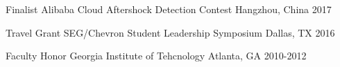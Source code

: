 \begin{cvhonors}

  \cvhonor
    {Finalist} %
    {Alibaba Cloud Aftershock Detection Contest} %
    {Hangzhou, China} %
    {2017} %

  \cvhonor
    {Travel Grant} %
    {SEG/Chevron Student Leadership Symposium} %
    {Dallas, TX} %
    {2016} %

  \cvhonor
    {Faculty Honor} %
    {Georgia Institute of Tehcnology} %
    {Atlanta, GA} %
    {2010-2012} %




\end{cvhonors}
